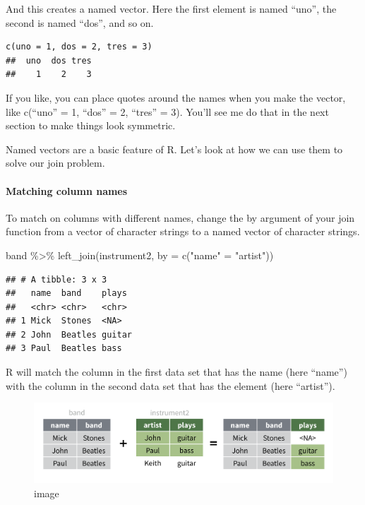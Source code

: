 \documentclass[
]{article}
\newenvironment{Shaded}{\begin{snugshade}}{\end{snugshade}}
\newcommand{\AttributeTok}[1]{\textcolor[rgb]{0.77,0.63,0.00}{#1}}
\newcommand{\FunctionTok}[1]{\textcolor[rgb]{0.00,0.00,0.00}{#1}}
\newcommand{\NormalTok}[1]{#1}
\newcommand{\OtherTok}[1]{\textcolor[rgb]{0.56,0.35,0.01}{#1}}
\newcommand{\SpecialCharTok}[1]{\textcolor[rgb]{0.00,0.00,0.00}{#1}}
\newcommand{\StringTok}[1]{\textcolor[rgb]{0.31,0.60,0.02}{#1}}
\begin{document}
And this creates a named vector. Here the first element is named
``uno'', the second is named ``dos'', and so on.

\begin{verbatim}
c(uno = 1, dos = 2, tres = 3)
##  uno  dos tres 
##    1    2    3
\end{verbatim}

If you like, you can place quotes around the names when you make the
vector, like c(``uno'' = 1, ``dos'' = 2, ``tres'' = 3). You'll see me do
that in the next section to make things look symmetric.

Named vectors are a basic feature of R. Let's look at how we can use
them to solve our join problem.

\hypertarget{matching-column-names}{%
\paragraph{Matching column names}\label{matching-column-names}}

To match on columns with different names, change the by argument of your
join function from a vector of character strings to a named vector of
character strings.

\begin{Shaded}
\begin{Highlighting}[]
\NormalTok{band }\SpecialCharTok{\%\textgreater{}\%} \FunctionTok{left\_join}\NormalTok{(instrument2, }\AttributeTok{by =} \FunctionTok{c}\NormalTok{(}\StringTok{"name"} \OtherTok{=} \StringTok{"artist"}\NormalTok{))}
\end{Highlighting}
\end{Shaded}

\begin{verbatim}
## # A tibble: 3 x 3
##   name  band    plays 
##   <chr> <chr>   <chr> 
## 1 Mick  Stones  <NA>  
## 2 John  Beatles guitar
## 3 Paul  Beatles bass
\end{verbatim}

R will match the column in the first data set that has the name (here
``name'') with the column in the second data set that has the element
(here ``artist'').

\begin{figure}
\centering
\includegraphics{data/match-names.png}
\caption{image}
\end{figure}
\end{document}

